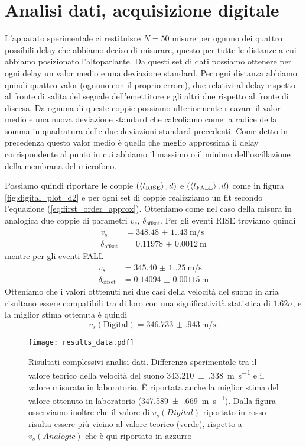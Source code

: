 \documentclass[
    rmp,
    reprint, 
    superscriptaddress, 
    altaffilletter, 
    amsmath, 
    amssymb, 
    a4paper,
    varvw]{revtex4-2}
\begin{document}
\section{Analisi dati, acquisizione digitale}

L'apparato sperimentale ci restituisce $N=50$ misure per ognuno dei quattro possibili delay che abbiamo deciso di misurare, questo per tutte le distanze a cui abbiamo posizionato l'altoparlante. Da questi set di dati possiamo ottenere per ogni delay un valor medio e una deviazione standard. Per ogni distanza abbiamo quindi quattro valori(ognuno con il proprio errore), due relativi al delay rispetto al fronte di salita del segnale dell'emettitore e gli altri due rispetto al fronte di discesa. Da ognuna di queste coppie possiamo ulteriormente ricavare il valor medio e una nuova deviazione standard che calcoliamo come la radice della somma in quadratura delle due deviazioni standard precedenti. Come detto in precedenza questo valor medio è quello che meglio approssima il delay corrispondente al punto in cui abbiamo il massimo o il minimo dell'oscillazione della membrana del microfono. 

Possiamo quindi riportare le coppie $(\expval{t_\text{RISE}}, d)$ e $(\expval{t_\text{FALL}}, d)$ come in figura \ref{fig:digital_plot_d2} e per ogni set di coppie realizziamo un fit secondo l'equazione (\ref{eq:first_order_approx}). Otteniamo come nel caso della misura in analogica due coppie di parametri $v_s$, $\delta_\text{offset}$.
Per gli eventi RISE troviamo quindi
\begin{align*}
    v_s &= \SI{348.48(1.43)}{\metre\per\second} \\
    \delta_\text{offset} &= \SI{0.11978(120)}{\metre}
\end{align*}
mentre per gli eventi FALL
\begin{align*}
    v_s &= \SI{345.40(1.25)}{\metre\per\second} \\
    \delta_\text{offset} &= \SI{0.14094(115)}{\metre}
\end{align*}
Otteniamo che i valori otttenuti nei due casi della velocità del suono in aria risultano essere compatibili tra di loro con una significatività statistica di $1.62\sigma$, e la miglior stima ottenuta è quindi \[v_s(\text{Digital}) = \SI{346.733(943)}{\metre\per\second}.\]


\begin{figure}
    \centering
    \texttt{[image: results\_data.pdf]}
    \caption{Risultati complessivi analisi dati. Differenza sperimentale tra il valore teorico della velocità del suono \SI{343.210(338)}{\metre\per\second} e il valore misurato in laboratorio. \`E riportata anche la miglior stima del valore ottenuto in laboratorio (\SI{347.589(669)}{\metre\per\second}). Dalla figura osserviamo inoltre che il valore di $v_s(Digital)$ riportato in rosso risulta essere più vicino al valore teorico (verde), rispetto a $v_s(Analogic)$ che è qui riportato in azzurro}\label{fig:results}
\end{figure}
\end{document}
